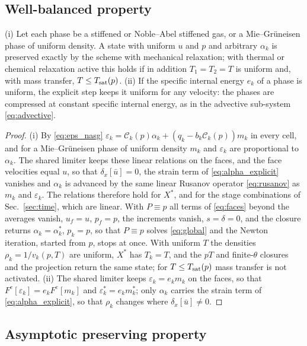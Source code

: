\subsection{Well-balanced property}
\label{sec:wb}
\begin{proposition}\label{prop:wb}
(i) Let each phase be a stiffened or Noble--Abel stiffened gas, or a Mie--Gr\"uneisen phase of uniform density. A state
with uniform $u$ and $p$ and arbitrary $\alpha_k$ is preserved exactly by the scheme with mechanical relaxation; with thermal
or chemical relaxation active this holds if in addition $T_1=T_2=T$ is uniform and, with mass transfer, $T\le T_{\rm sat}(p)$.
(ii) If the specific internal energy $e_k$ of a phase is uniform, the explicit step keeps it uniform for any velocity: the
phases are compressed at constant specific internal energy, as in the advective sub-system \eqref{eq:advective}.
\end{proposition}
\begin{proof}
(i) By \eqref{eq:eps_nasg} $\varepsilon_k=\mathcal C_k(p)\alpha_k+(q_k-b_k\mathcal C_k(p))m_k$ in every cell, and for a Mie--Gr\"uneisen phase of
uniform density $m_k$ and $\varepsilon_k$ are proportional to $\alpha_k$. The shared limiter keeps these linear relations
on the faces, and the face velocities equal $u$, so that $\delta_x[\bar u]=0$, the strain term of \eqref{eq:alpha_explicit} vanishes and $\alpha_k$
is advanced by the same linear Rusanov operator \eqref{eq:rusanov} as $m_k$ and $\varepsilon_k$. The relations therefore hold for $X^*$,
and for the stage combinations of Sec.~\ref{sec:time}, which are linear. With $P\equiv p$ all terms of \eqref{eq:faces} beyond the averages
vanish, $u_f=u$, $p_f=p$, the increments vanish, $s=\delta=0$, and the closure returns $\alpha_k=\alpha^*_k$, $p_k=p$, so that $P\equiv p$ solves
\eqref{eq:global} and the Newton iteration, started from $p$, stops at once. With uniform $T$ the densities $\rho_k=1/v_k(p,T)$
are uniform, $X^*$ has $T_k=T$, and the $pT$ and finite-$\theta$ closures and the projection return the same state; for
$T\le T_{\rm sat}(p)$ mass transfer is not activated. (ii) The shared limiter keeps $\varepsilon_k=e_km_k$ on the faces, so that
$F^e[\varepsilon_k]=e_kF^e[m_k]$ and $\varepsilon^*_k=e_km^*_k$; only $\alpha_k$ carries the strain term of \eqref{eq:alpha_explicit}, so that $\rho_k$
changes where $\delta_x[\bar u]\ne0$.
\end{proof}

\subsection{Asymptotic preserving property}
\label{sec:ap}
